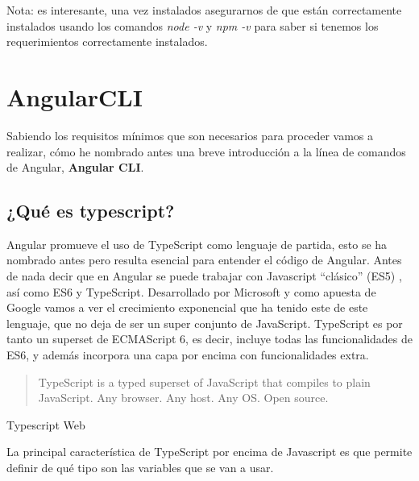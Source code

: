 Nota: es interesante, una vez instalados asegurarnos de que están correctamente instalados usando los comandos \emph{node -v} y \emph{npm -v} para saber si tenemos los requerimientos correctamente instalados.


\section{AngularCLI}\label{angularCLI}
Sabiendo los requisitos mínimos que son necesarios para proceder vamos a realizar, cómo he nombrado antes una breve introducción a la línea de comandos de Angular,  \textbf{Angular CLI}.

\subsection{¿Qué es typescript?}\label{typesript}
Angular  promueve el uso de TypeScript como lenguaje de partida, esto se ha nombrado antes pero resulta esencial para entender el código de Angular. Antes de nada decir que en Angular se puede trabajar con Javascript “clásico” (ES5) \cite{ecma}, así como ES6 y TypeScript. Desarrollado por Microsoft y como apuesta de Google vamos a ver el crecimiento exponencial que ha tenido este de este lenguaje, que no deja de ser un super conjunto de JavaScript. 
 TypeScript es por tanto un superset de ECMAScript 6, es decir, incluye todas las funcionalidades de ES6, y además incorpora una capa por encima con funcionalidades extra.

\begin{center}
    \begin{minipage}{0.9\linewidth}
        \vspace{5pt}%
        {\small
        \begin{quote}
            TypeScript is a typed superset of JavaScript that compiles to plain JavaScript. Any browser. Any host. Any OS. Open source.
            \end{quote}
        }
        \begin{flushright}
            Typescript Web \cite{typescript}
        \end{flushright}
        \vspace{5pt}%
    \end{minipage}
\end{center}

La principal característica de TypeScript por encima de Javascript es que permite definir de qué tipo son las variables que se van a usar.

